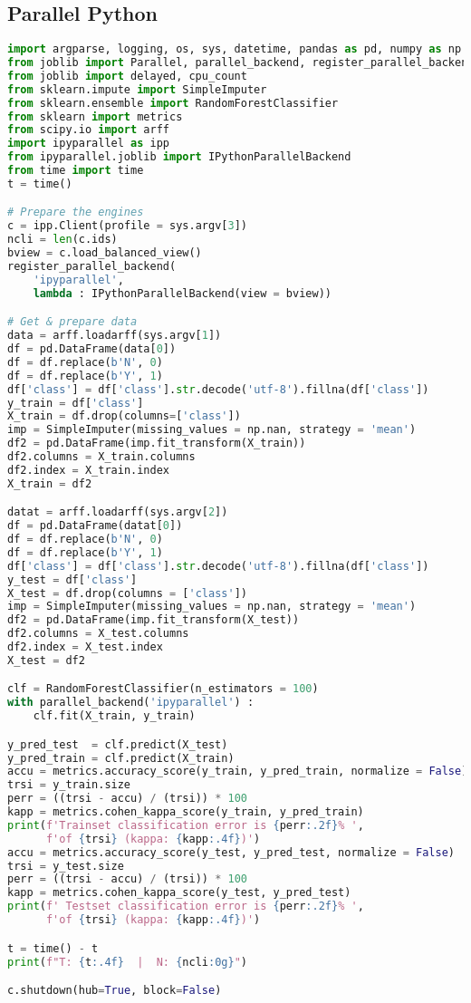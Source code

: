 \subsection{Parallel Python}
\begin{lstlisting}[language=Python, caption={Parallel Python implementation of the RF test case.}]
import argparse, logging, os, sys, datetime, pandas as pd, numpy as np
from joblib import Parallel, parallel_backend, register_parallel_backend
from joblib import delayed, cpu_count
from sklearn.impute import SimpleImputer
from sklearn.ensemble import RandomForestClassifier
from sklearn import metrics
from scipy.io import arff
import ipyparallel as ipp
from ipyparallel.joblib import IPythonParallelBackend
from time import time
t = time()

# Prepare the engines
c = ipp.Client(profile = sys.argv[3])
ncli = len(c.ids)
bview = c.load_balanced_view()
register_parallel_backend(
    'ipyparallel',
    lambda : IPythonParallelBackend(view = bview))

# Get & prepare data
data = arff.loadarff(sys.argv[1])
df = pd.DataFrame(data[0])
df = df.replace(b'N', 0)
df = df.replace(b'Y', 1)
df['class'] = df['class'].str.decode('utf-8').fillna(df['class'])
y_train = df['class']
X_train = df.drop(columns=['class'])
imp = SimpleImputer(missing_values = np.nan, strategy = 'mean')
df2 = pd.DataFrame(imp.fit_transform(X_train))
df2.columns = X_train.columns
df2.index = X_train.index
X_train = df2

datat = arff.loadarff(sys.argv[2])
df = pd.DataFrame(datat[0])
df = df.replace(b'N', 0)
df = df.replace(b'Y', 1)
df['class'] = df['class'].str.decode('utf-8').fillna(df['class'])
y_test = df['class']
X_test = df.drop(columns = ['class'])
imp = SimpleImputer(missing_values = np.nan, strategy = 'mean')
df2 = pd.DataFrame(imp.fit_transform(X_test))
df2.columns = X_test.columns
df2.index = X_test.index
X_test = df2

clf = RandomForestClassifier(n_estimators = 100)
with parallel_backend('ipyparallel') :
    clf.fit(X_train, y_train)

y_pred_test  = clf.predict(X_test)
y_pred_train = clf.predict(X_train)
accu = metrics.accuracy_score(y_train, y_pred_train, normalize = False)
trsi = y_train.size
perr = ((trsi - accu) / (trsi)) * 100
kapp = metrics.cohen_kappa_score(y_train, y_pred_train)
print(f'Trainset classification error is {perr:.2f}% ',
      f'of {trsi} (kappa: {kapp:.4f})')
accu = metrics.accuracy_score(y_test, y_pred_test, normalize = False)
trsi = y_test.size
perr = ((trsi - accu) / (trsi)) * 100
kapp = metrics.cohen_kappa_score(y_test, y_pred_test)
print(f' Testset classification error is {perr:.2f}% ',
      f'of {trsi} (kappa: {kapp:.4f})')

t = time() - t
print(f"T: {t:.4f}  |  N: {ncli:0g}")

c.shutdown(hub=True, block=False)
\end{lstlisting}





